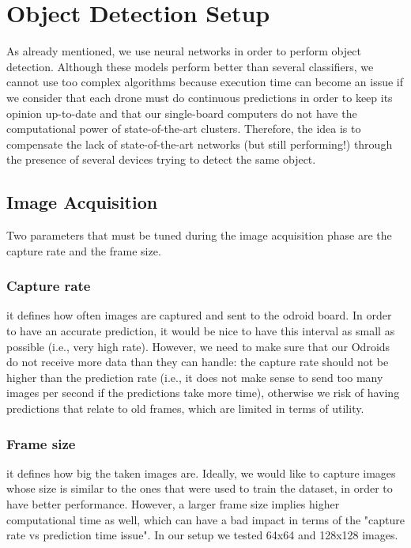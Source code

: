 \documentclass[10pt,conference,compsocconf]{IEEEtran}
\begin{document}
\section{Object Detection Setup}
As already mentioned, we use neural networks in order to perform object detection. Although these models perform better than several classifiers, we cannot use too complex algorithms because execution time can become an issue if we consider that each drone must do continuous predictions in order to keep its opinion up-to-date and that our single-board computers do not have the computational power of state-of-the-art clusters. Therefore, the idea is to compensate the lack of state-of-the-art networks (but still performing!) through the presence of several devices trying to detect the same object.
\subsection{Image Acquisition}
Two parameters that must be tuned during the image acquisition phase are the capture rate and the frame size.
\subsubsection{Capture rate} it defines how often images are captured and sent to the odroid board. In order to have an accurate prediction, it would be nice to have this interval as small as possible (i.e., very high rate). However, we need to make sure that our Odroids do not receive more data than they can handle: the capture rate should not be higher than the prediction rate (i.e., it does not make sense to send too many images per second if the predictions take more time), otherwise we risk of having predictions that relate to old frames, which are limited in terms of utility.
\subsubsection{Frame size} it defines how big the taken images are. Ideally, we would like to capture images whose size is similar to the ones that were used to train the dataset, in order to have better performance. However, a larger frame size implies higher computational time as well, which can have a bad impact in terms of the "capture rate vs prediction time issue".
In our setup we tested 64x64 and 128x128 images.
\end{document}
